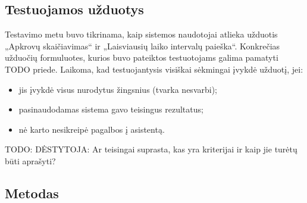 


\subsection{Testuojamos užduotys}

Testavimo metu buvo tikrinama, kaip sistemos naudotojai atlieka užduotis
„Apkrovų skaičiavimas“ ir „Laisviausių laiko intervalų paieška“.
Konkrečias užduočių formuluotes, kurios buvo pateiktos testuotojams
galima pamatyti TODO priede. Laikoma, kad testuojantysis visiškai sėkmingai
įvykdė užduotį, jei:
\begin{itemize}
  \item jis įvykdė visus nurodytus žingsnius (tvarka nesvarbi);
  \item pasinaudodamas sistema gavo teisingus rezultatus;
  \item nė karto nesikreipė pagalbos į asistentą.
\end{itemize}
TODO: DĖSTYTOJA: Ar teisingai suprasta, kas yra kriterijai ir kaip jie
turėtų būti aprašyti?

\subsection{Metodas}

